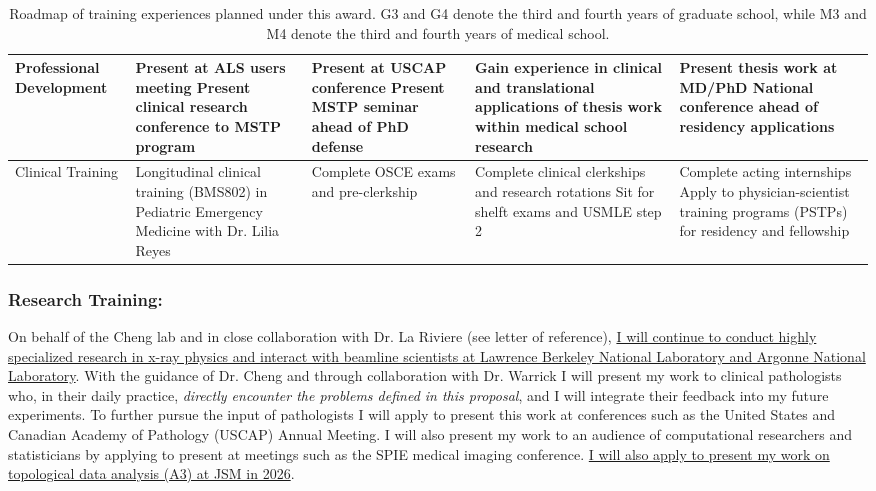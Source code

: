 \documentclass{NIHGrant}
\begin{document}
\begin{table}[h]
\begin{tabularx}{\textwidth}{|l|>{\centering\arraybackslash}X|>{\centering\arraybackslash}X|>{\centering\arraybackslash}X|>{\centering\arraybackslash}X|}
\hline
    Professional Development &
    Present at ALS users meeting
    Present clinical research conference to MSTP program &
    Present at USCAP conference \newline
    Present MSTP seminar ahead of PhD defense&
    Gain experience in clinical and translational applications of thesis work within medical school research &
    Present thesis work at MD/PhD National conference ahead of residency applications \\
    \hline
    Clinical Training &
    Longitudinal clinical training (BMS802) in Pediatric Emergency Medicine with Dr. Lilia Reyes &
    Complete OSCE exams and pre-clerkship &
    Complete clinical clerkships and research rotations \newline
    Sit for shelft exams and USMLE step 2 &
    Complete acting internships \newline Apply to physician-scientist training programs (PSTPs) for residency and fellowship\\
  \hline
\end{tabularx}
\caption{Roadmap of training experiences planned under this award. G3 and G4 denote the third and fourth years of graduate school, while M3 and M4 denote the third and fourth years of medical school.}
\label{tab:goals}
\end{table}

\subsubsection*{Research Training: }
 On behalf of the Cheng lab and in close collaboration with Dr. La Riviere (see letter of reference), \uline{I will continue to conduct highly specialized research in x-ray physics and interact with beamline scientists at Lawrence Berkeley National Laboratory and Argonne National Laboratory}. With the guidance of Dr. Cheng and through collaboration with Dr. Warrick I will present my work to clinical pathologists who, in their daily practice, \emph{directly encounter the problems defined in this proposal}, and I will integrate their feedback into my future experiments. To further pursue the input of pathologists I will apply to present this work at conferences such as the United States and Canadian Academy of Pathology (USCAP) Annual Meeting. I will also present my work to an audience of computational researchers and statisticians by applying to present at meetings such as the SPIE medical imaging conference. \uline{I will also apply to present my work on topological data analysis (A3) at JSM in 2026}.
\end{document}
